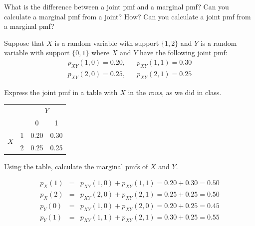 \documentclass[addpoints,12pt]{exam}
\begin{document}
\begin{questions}
		

\question What is the difference between a joint pmf and a marginal pmf? Can you calculate a marginal pmf from a joint? How? Can you calculate a joint pmf from a marginal pmf?

\question Suppose that $X$ is a random variable with support $\{1,2\}$ and $Y$ is a random variable with support $\{0,1\}$ where $X$ and $Y$ have the following joint pmf: 
			\begin{eqnarray*}
				p_{XY}(1,0) = 0.20, && p_{XY}(1,1) = 0.30 \\
				p_{XY}(2,0) = 0.25, && p_{XY}(2,1) = 0.25
			\end{eqnarray*}
	\begin{parts}
  \item Express the joint pmf in a table with $X$ in the \emph{rows}, as we did in class. 
			\begin{solution}
			\begin{center}
\begin{tabular}{|cc|cc|}
\hline
&&\multicolumn{2}{c|}{$Y$}\\
&&0 & 1\\
\hline
\multirow{2}{*}{$X$}
&1& \multicolumn{1}{|c}{0.20} & 0.30\\
&2& \multicolumn{1}{|c}{0.25} & 0.25\\
\hline
\end{tabular}
\end{center}
			\end{solution}
		\item Using the table, calculate the marginal pmfs of $X$ and $Y$.
			\begin{solution}
				\begin{eqnarray*}
					p_X(1) &=&p_{XY}(1,0) + p_{XY}(1,1)=0.20+0.30 = 0.50 \\
					p_X(2) &=&p_{XY}(2,0) + p_{XY}(2,1)=0.25 + 0.25 = 0.50 \\
					p_Y(0) &=&p_{XY}(1,0) + p_{XY}(2,0) = 0.20 + 0.25 = 0.45 \\
					p_Y(1) &=& p_{XY}(1,1) + p_{XY}(2,1) = 0.30 + 0.25 = 0.55
				\end{eqnarray*}
			\end{solution}
\end{parts}


\end{questions}
\end{document}
